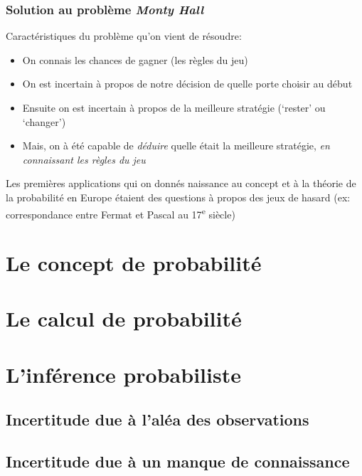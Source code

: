 \documentclass{beamer}
\begin{document}
\begin{frame}
    \frametitle{Solution au problème \emph{Monty Hall}}
    Caractéristiques du problème qu’on vient de résoudre: \pause
    \begin{itemize}
      \item On connais les chances de gagner (les règles du jeu) \pause
      \item On est incertain à propos de notre décision de quelle porte choisir au début  \pause
      \item Ensuite on est incertain à propos de la meilleure stratégie (‘rester’ ou ‘changer’)  \pause
      \item Mais, on à été capable de \emph{déduire} quelle était la meilleure stratégie,
            \emph{en connaissant les règles du jeu}
    \end{itemize}

    \vfill \pause

    Les premières applications qui on donnés naissance au concept et
    à la théorie de la probabilité en Europe étaient des questions à propos
    des jeux de hasard (ex: correspondance entre Fermat et Pascal au 17\textsuperscript{e} siècle)
\end{frame}




\section{Le concept de probabilité}

\section{Le calcul de probabilité}

\section{L'inférence probabiliste}

\subsection{Incertitude due à l'aléa des observations}%

\subsection{Incertitude due à un manque de connaissance}%
\end{document}
